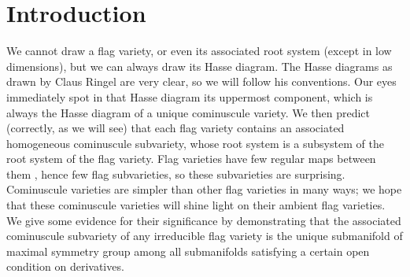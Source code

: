 \documentclass[a4paper,10pt]{amsart}
\theoremstyle{remark}
\begin{document}
\section{Introduction}
We cannot draw a flag variety, or even its associated root system (except in low dimensions), but we can always draw its Hasse diagram.
The Hasse diagrams as drawn by Claus Ringel \cite{Ringel2013} are very clear, so we will follow his conventions.
Our eyes immediately spot in that Hasse diagram its uppermost component, which is always the Hasse diagram of a unique cominuscule variety.
We then predict (correctly, as we will see) that each flag variety contains an associated homogeneous cominuscule subvariety, whose root system is a subsystem of the root system of the flag variety.
Flag varieties have few regular maps between them \cite{bakshi2023morphisms,kumar2023nonexistence,naldi2022morphisms,occhetta2023morphisms,Sierra:2021,Tango:1974,Tango:1976}, hence few flag subvarieties, so these subvarieties are surprising.
Cominuscule varieties are simpler than other flag varieties in many ways; we hope that these cominuscule varieties will shine light on their ambient flag varieties.
We give some evidence for their significance by demonstrating that the associated cominuscule subvariety of any irreducible flag variety is the unique submanifold of maximal symmetry group among all submanifolds satisfying a certain open condition on derivatives.
\end{document}
